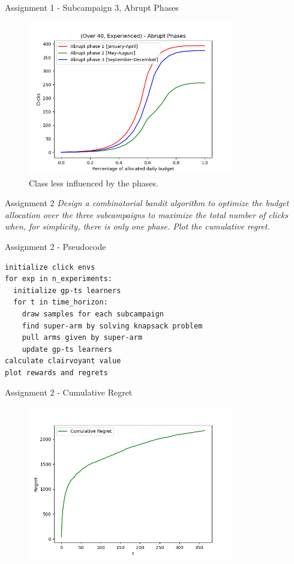 \documentclass[11pt]{beamer}
\begin{document}
\begin{frame}{Assignment 1 - Subcampaign 3, Abrupt Phases}
\begin{figure}[hbtp]
\centering
\includegraphics[width=0.8\textwidth]{images/subcampaign_1_abrupt_phases.png}
\caption{Class less influenced by the phases.}
\end{figure}
\end{frame}

\begin{frame}{Assignment 2}
\textit{Design a combinatorial bandit algorithm to optimize the budget allocation over the three subcampaigns to maximize the total number of clicks when, for simplicity, there is only one phase. Plot the cumulative regret.}
\end{frame}

\begin{frame}[fragile]{Assignment 2 - Pseudocode}
\begin{lstlisting}
initialize click envs
for exp in n_experiments:
  initialize gp-ts learners
  for t in time_horizon:
    draw samples for each subcampaign
    find super-arm by solving knapsack problem
    pull arms given by super-arm
    update gp-ts learners
calculate clairvoyant value
plot rewards and regrets
\end{lstlisting}
\end{frame}

\begin{frame}{Assignment 2 -  Cumulative Regret}
\begin{figure}[hbtp]
\centering
\includegraphics[width=0.8\textwidth]{images/assignment_2_cum_regret.png}
\caption{}
\end{figure}
\end{frame}
\end{document}

